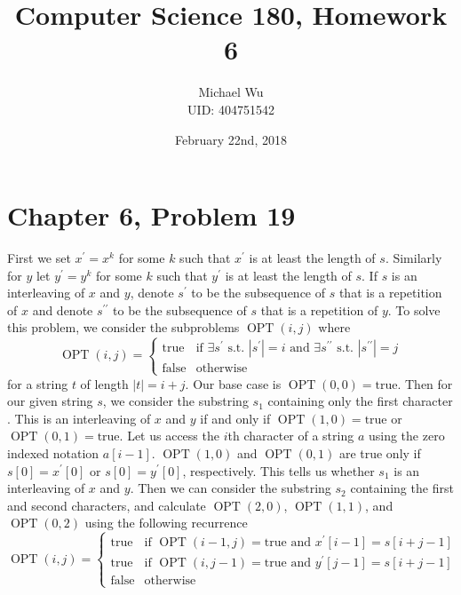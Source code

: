 \documentclass[12pt]{article}
\begin{document}
\title{Computer Science 180, Homework 6}
\date{February 22nd, 2018}
\author{Michael Wu\\UID: 404751542}
\maketitle

\section*{Chapter 6, Problem 19}

First we set \(x^\prime=x^k\) for some \(k\) such that \(x^\prime\) is at least the length of \(s\). Similarly for \(y\)
let \(y^\prime=y^k\) for some \(k\) such that \(y^\prime\) is at least the length of \(s\). If \(s\) is an interleaving of
\(x\) and \(y\), denote \(s^\prime\) to be the subsequence of \(s\) that is a repetition of \(x\) and denote \(s^{\prime\prime}\)
to be the subsequence of \(s\) that is a repetition of \(y\). To solve this problem, we consider the subproblems \(\operatorname{OPT}(i,j)\) where
\[
        \operatorname{OPT}(i,j)=\begin{cases}
                \text{true} & \text{if }\exists s^\prime\text{ s.t. } |s^\prime|=i\text{ and }\exists s^{\prime\prime}\text{ s.t. }|s^{\prime\prime}|=j\\
                \text{false} & \text{otherwise}
        \end{cases}
\]
for a string \(t\) of length \(|t|=i+j\). Our base case is \(\operatorname{OPT}(0,0)=\text{true}\). Then for our given string \(s\), we consider the substring
\(s_1\) containing only the first character . This is an interleaving of \(x\) and \(y\) if and only if \(\operatorname{OPT}(1,0)=\text{true}\) or
\(\operatorname{OPT}(0,1)=\text{true}\). Let us access the \(i\)th character of a string \(a\) using the zero indexed notation \(a[i-1]\). \(\operatorname{OPT}(1,0)\)
and \(\operatorname{OPT}(0,1)\) are true only if \(s[0]=x^\prime[0]\) or \(s[0]=y^\prime[0]\), respectively. This tells us whether \(s_1\) is an interleaving of \(x\)
and \(y\). Then we can consider the substring \(s_2\) containing the first and second characters, and calculate \(\operatorname{OPT}(2,0)\),
\(\operatorname{OPT}(1,1)\), and \(\operatorname{OPT}(0,2)\) using the following recurrence
\[
        \operatorname{OPT}(i,j)=\begin{cases}
                \text{true} & \text{if }\operatorname{OPT}(i-1,j)=\text{true and }x^\prime[i-1]=s[i+j-1]\\
                \text{true} & \text{if }\operatorname{OPT}(i,j-1)=\text{true and }y^\prime[j-1]=s[i+j-1]\\
                \text{false} & \text{otherwise}
        \end{cases}
\]
\end{document}

